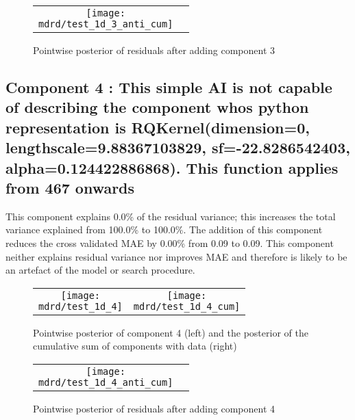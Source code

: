 \documentclass{article} %
\begin{document}
\begin{figure}[H]
\newcommand{\wmgd}{0.5\columnwidth}
\newcommand{\hmgd}{3.0cm}
\newcommand{\mdrd}{test_1d}
\newcommand{\mbm}{\hspace{-0.3cm}}
\begin{tabular}{cc}
\mbm \texttt{[image: \\mdrd/test\_1d\_3\_anti\_cum]}
\end{tabular}
\caption{Pointwise posterior of residuals after adding component 3}
\label{fig:comp3}
\end{figure}

\subsection{Component 4 : This simple AI is not capable of describing the component whos python representation is RQKernel(dimension=0, lengthscale=9.88367103829, sf=-22.8286542403, alpha=0.124422886868). This function applies from  467 onwards}



This component explains 0.0\% of the residual variance; this increases the total variance explained from 100.0\% to 100.0\%.
The addition of this component reduces the cross validated MAE by 0.00\% from 0.09 to 0.09.
This component neither explains residual variance nor improves MAE and therefore is likely to be an artefact of the model or search procedure.

\begin{figure}[H]
\newcommand{\wmgd}{0.5\columnwidth}
\newcommand{\hmgd}{3.0cm}
\newcommand{\mdrd}{test_1d}
\newcommand{\mbm}{\hspace{-0.3cm}}
\begin{tabular}{cc}
\mbm \texttt{[image: \\mdrd/test\_1d\_4]} & \texttt{[image: \\mdrd/test\_1d\_4\_cum]}
\end{tabular}
\caption{Pointwise posterior of component 4 (left) and the posterior of the cumulative sum of components with data (right)}
\label{fig:comp4}
\end{figure}

\begin{figure}[H]
\newcommand{\wmgd}{0.5\columnwidth}
\newcommand{\hmgd}{3.0cm}
\newcommand{\mdrd}{test_1d}
\newcommand{\mbm}{\hspace{-0.3cm}}
\begin{tabular}{cc}
\mbm \texttt{[image: \\mdrd/test\_1d\_4\_anti\_cum]}
\end{tabular}
\caption{Pointwise posterior of residuals after adding component 4}
\label{fig:comp4}
\end{figure}
\end{document}
